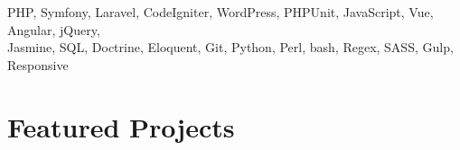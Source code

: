 \documentclass[margin,line]{resume}
\begin{document}
\begin{resume}
PHP, Symfony, Laravel, CodeIgniter, WordPress, PHPUnit, JavaScript, Vue, Angular, jQuery,\\ Jasmine, SQL, Doctrine, Eloquent, Git, Python, Perl, bash, Regex, SASS, Gulp, Responsive













\section{\mysidestyle Featured Projects}


\end{resume}
\end{document}
